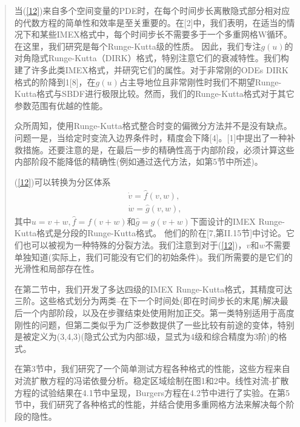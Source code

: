 \documentclass{article}
\begin{document}
\begin{CJK}{UTF8}{gkai}
\begin{quotation}
当(\ref{12})来自多个空间变量的PDE时，在每个时间步长离散隐式部分相对应的代数方程的简单性和效率是至关重要的。在[2]中，我们表明，在适当的情况下和某些IMEX格式中，每个时间步长不需要多于一个多重网格W循环。在这里，我们研究是每个Runge-Kutta级的性质。 因此，我们专注$g(u)$的对角隐式Runge-Kutta（DIRK）格式，特别注意它们的衰减特性。我们构建了许多此类IMEX格式，并研究它们的属性。对于非常刚的ODEs DIRK格式的阶降到1[8]，在$g(u)$占主导地位且非常刚性时我们不期望Runge-Kutta格式与SBDF进行极限比较。然而，我们的Runge-Kutta格式对于其它参数范围有优越的性能。

众所周知，使用Runge-Kutta格式整合时变的偏微分方法并不是没有缺点。问题一是，当给定时变流入边界条件时，精度会下降[4]。[1]中提出了一种补救措施。还要注意的是，在最后一步的精确性高于内部阶段，必须计算这些内部阶段不能降低的精确性(例如通过迭代方法，如第5节中所述)。

(\ref{12})可以转换为分区体系
\begin{gather*}
\dot{v}=\widehat{f}(v,w),
\label{131} \\
\dot{w}=\widehat{g}(v,w),
\label{132}
\end{gather*}
其中$u=v+w,\widehat{f}=f(v+w)$和$\widehat{g}=g(v+w)$下面设计的IMEX Runge-Kutta格式是分段的Runge-Kutta格式。 他们的阶在[7,第II.15节]中讨论。它们也可以被视为一种特殊的分裂方法。我们注意到对于(\ref{12})，$v$和$w$不需要单独知道(实际上，我们可能没有它们的初始条件)。我们所需要的是它们的光滑性和局部存在性。

在第二节中，我们开发了多达四级的IMEX Runge-Kutta格式，其精度可达三阶。这些格式划分为两类--在下一个时间处(即在时间步长的末尾)解决最后一个内部阶段，以及在步骤结束处使用附加正交。第一类特别适用于高度刚性的问题，但第二类似乎为广泛参数提供了一些比较有前途的变体，特别是被定义为(3,4,3)(隐式公式为内部3级，显式为4级和综合精度为3阶)的格式。

在第3节中，我们研究了一个简单测试方程各种格式的性能，这些方程来自对流扩散方程的冯诺依曼分析。稳定区域绘制在图1和2中。线性对流-扩散方程的试验结果在4.1节中呈现，Burgers方程在4.2节中进行了实验。在第5节中，我们研究了各种格式的性能，并结合使用多重网格方法来解决每个阶段的隐性。



\end{quotation}
\end{CJK}
\end{document}
